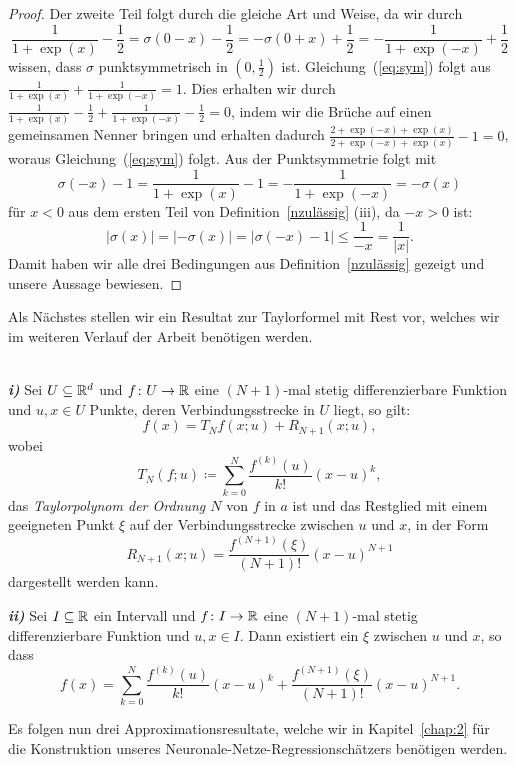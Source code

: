 \begin{proof}
Der zweite Teil folgt durch die gleiche Art und Weise, da wir durch 
\begin{equation}
\label{eq:sym}
\frac{1}{1 + \exp(x)} - \frac{1}{2}= \sigma(0 - x) - \frac{1}{2} = -\sigma(0 + x) + \frac{1}{2} = -\frac{1}{1 + \exp(-x)} + \frac{1}{2}
\end{equation}
wissen, dass $\sigma$ punktsymmetrisch in $(0, \frac{1}{2})$ ist. 
Gleichung~(\ref{eq:sym}) folgt aus $\frac{1}{1 + \exp(x)} + \frac{1}{1 + \exp(-x)} = 1$.
Dies erhalten wir durch $\frac{1}{1 + \exp(x)} - \frac{1}{2} +\frac{1}{1 + \exp(-x)} - \frac{1}{2} = 0$, indem wir die Brüche auf einen gemeinsamen Nenner bringen und erhalten dadurch
$\frac{2 + \exp(-x) + \exp(x)}{2 + \exp(-x) + \exp(x)} - 1 = 0$, woraus  Gleichung~(\ref{eq:sym}) folgt.
Aus der Punktsymmetrie folgt mit $$\sigma(- x) - 1 = \frac{1}{1 + \exp(x)} - 1 = -\frac{1}{1 + \exp(-x)} = -\sigma(x)$$ für $x < 0$ aus dem ersten Teil von Definition~\ref{nzulässig} (iii), da $-x > 0 $ ist:  
$$|\sigma(x)| = |-\sigma(x)| = |\sigma(- x) - 1| \leq \frac{1}{-x} = \frac{1}{|x|}.$$
Damit haben wir alle drei Bedingungen aus Definition~\ref{nzulässig} gezeigt und unsere Aussage bewiesen.
\end{proof}
Als Nächstes stellen wir ein Resultat zur Taylorformel mit Rest vor, welches wir im weiteren Verlauf der Arbeit benötigen werden.

\begin{lem}
\label{lem:lagrange} \ \\
\textbf{\emph{i)}} Sei $U \subseteq \mathbb{R}^d$ und $f\colon U \to \mathbb{R}$ eine $(N + 1)$-mal stetig differenzierbare Funktion und $u, x \in U$ Punkte, deren Verbindungsstrecke in $U$ liegt, so gilt:
$$ f(x) = T_Nf(x;u) + R_{N + 1}(x;u),$$
wobei
$$
T_N(f;u) \coloneqq \sum_{k = 0}^N \frac{f^{(k)}(u)}{k!} (x - u)^k,
$$
das \emph{Taylorpolynom der Ordnung $N$} von $f$ in $a$ ist und das Restglied mit einem geeigneten Punkt $\xi$ auf der Verbindungsstrecke zwischen $u$ und $x$, in der Form 
$$ R_{N + 1}(x;u) = \frac{f^{(N + 1)}(\xi)}{(N + 1)!} (x - u)^{N + 1}$$
dargestellt werden kann.

\textbf{\emph{ii)}} Sei $I \subseteq \mathbb{R}$ ein Intervall und $f \colon I \to \mathbb{R}$ eine $(N + 1)$-mal stetig differenzierbare Funktion und $u, x \in I$. Dann existiert ein $\xi$ zwischen $u$ und $x$, so dass $$f(x) = \sum_{k = 0}^N \frac{f^{(k)}(u)}{k!}(x - u)^k + \frac{f^{(N + 1)}(\xi)}{(N + 1)!}(x - u)^{N + 1}.$$
\end{lem}
Es folgen nun drei Approximationsresultate, welche wir in Kapitel~\ref{chap:2} für die Konstruktion unseres Neuronale-Netze-Regressionschätzers benötigen werden.

